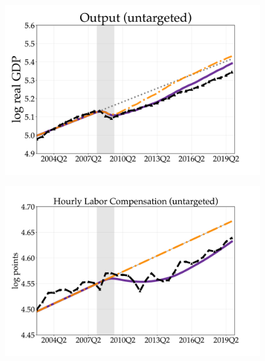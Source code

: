 \begin{figure}[H]
\begin{minipage}{0.51\textwidth}
\label{fig:c}
\end{minipage}\hspace*{\fill}
\begin{minipage}{0.51\textwidth}
\includegraphics[scale=.29]{text/chapter1/Figures/GR_sim/Cleaner/Output_vs_data_large_new}
 \label{fig:d}
\end{minipage}
\medskip
\begin{minipage}{0.51\textwidth}
\includegraphics[scale=.29]{text/chapter1/Figures/GR_sim/Cleaner/hourly_comp_vs_data_large_new}
 \label{fig:e}
\end{minipage}\hspace*{\fill}
\begin{minipage}{0.51\textwidth}

\end{minipage}
\end{figure}
